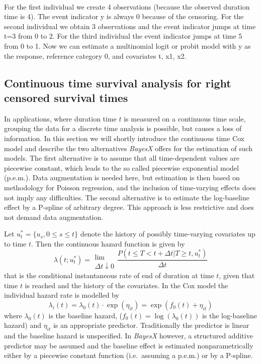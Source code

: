 \documentclass[11pt,a4paper,twoside]{bayesxarticle}
\begin{document}
\vspace{0.5cm}\\
For the first individual we create 4 observations (because the
observed duration time is 4). The event indicator y is always 0
because of the censoring. For the second individual we obtain 3
observations and the event indicator jumps at time t=3 from 0 to
2. For the third individual the event indicator jumps at time 5
from 0 to 1. Now we can estimate a multinomial logit or probit
model with y as the response, reference category 0, and covariates
t, x1, x2.


\subsection{Continuous time survival analysis for right censored survival times}
\label{continuoustime}

In applications, where duration time $t$ is measured on a
continuous time scale, grouping the data for a discrete time
analysis is possible, but causes a loss of information. In this
section we will shortly introduce the continuous time Cox model
and describe the two alternatives \textit{BayesX} offers for the
estimation of such models. The first alternative is to assume that
all time-dependent values are piecewise constant, which leads to
the so called piecewise exponential model (p.e.m.). Data
augmentation is needed here, but estimation is then based on
methodology for Poisson regression, and the inclusion of
time-varying effects does not imply any difficulties. The second
alternative is to estimate the log-baseline effect by a P-spline
of arbitrary degree. This approach is less restrictive and does
not demand data augmentation.

Let $u_t^{*}=\{u_s,0 \le s \le t\}$ denote the history of possibly
time-varying covariates up to time $t$. Then the continuous hazard
function is given by
\[
\lambda(t;u_t^{*})=\begin{array}{c}\\\mbox{lim}\\{\Delta t
\downarrow 0}\end{array}\frac{P(t \le T< t+\Delta t | T\ge t,
u_t^{*})}{\Delta t}
\]
that is the conditional instantaneous rate of end of duration at
time $t$, given that time $t$ is reached and the history of the
covariates. In the Cox model the individual hazard rate is
modelled by
\begin{equation}\label{CoxModel}
\lambda_i(t)=\lambda_0(t)\cdot
\exp(\eta_{it})=\exp(f_0(t)+\eta_{it})
\end{equation}
where $\lambda_0(t)$ is the baseline hazard,
($f_0(t)=\log(\lambda_0(t))$ is the log-baseline hazard) and
$\eta_{it}$ is an appropriate predictor. Traditionally the
predictor is linear and the baseline hazard is unspecified. In
\textit{BayesX} however, a structured additive predictor may be
assumed and the baseline effect is estimated nonparametrically
either by a piecewise constant function (i.e.~assuming a p.e.m.)
or by a P-spline.
\end{document}
